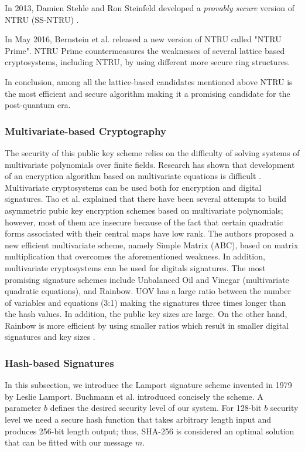 \documentclass[conference, letterpaper]{IEEEtran}
\begin{document}
In 2013, Damien Stehle and Ron Steinfeld developed a \textit{provably secure} version of NTRU (SS-NTRU) \cite{cryptoeprint2013}.

In May 2016, Bernstein et al. \cite{bernstein2016ntru} released a new version of NTRU called "NTRU Prime". NTRU Prime countermeasures the weaknesses of several lattice based cryptosystems, including NTRU, by using different more secure ring structures.

In conclusion, among all the lattice-based candidates mentioned above NTRU is the most efficient and secure algorithm making it a promising candidate for the post-quantum era.

\subsubsection{Multivariate-based Cryptography}
The security of this public key scheme relies on the difficulty of solving systems of multivariate polynomials over finite fields. Research has shown that development of an encryption algorithm based on multivariate equations is difficult \cite{Buchanan2016}. Multivariate cryptosystems can be used both for encryption and digital signatures. Tao et al. \cite{tao2013simple} explained  that there have been several attempts to build asymmetric pubic key encryption schemes based on multivariate polynomials; however, most of them are insecure because of the fact that certain quadratic forms associated with their central maps have low rank. The authors \cite{tao2013simple} proposed a new efficient multivariate scheme, namely Simple Matrix (ABC), based on matrix multiplication that overcomes the aforementioned weakness. In addition, multivariate cryptosystems can be used for digitals signatures. The most promising signature schemes include Unbalanced Oil and Vinegar (multivariate quadratic equations), and Rainbow. UOV has a large ratio between the number of variables and equations (3:1) making the signatures three times longer than the hash values. In addition, the public key sizes are large. On the other hand, Rainbow is more efficient by using smaller ratios which result in smaller digital signatures and key sizes \cite{Campagna2015}.

\subsubsection{Hash-based Signatures}

In this subsection, we introduce the Lamport signature scheme invented in 1979 by Leslie Lamport. Buchmann et al. \cite{Buchmann2010} introduced concisely the scheme. A parameter $b$ defines the desired security level of our system. For 128-bit $b$ security level we need a secure hash function that takes arbitrary length input and produces 256-bit length output; thus, SHA-256 is considered an optimal solution that can be fitted with our message $m$.
\end{document}
